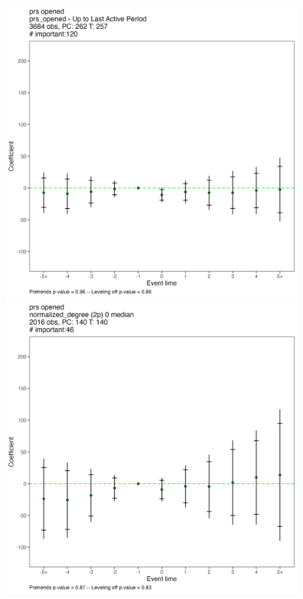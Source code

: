 \begin{figure}[htbp]
    \begin{minipage}[b]{0.32\textwidth}
        \centering
        \includegraphics[width=\textwidth]{temp/normalized_degree_val/all_prs_opened_early_sample.png}
    \end{minipage}
    \hfill
    \begin{minipage}[b]{0.32\textwidth}
        \centering
        \includegraphics[width=\textwidth]{temp/normalized_degree_val/all_normalized_degree_2p_0_median.png}

\end{minipage}
\end{figure}
